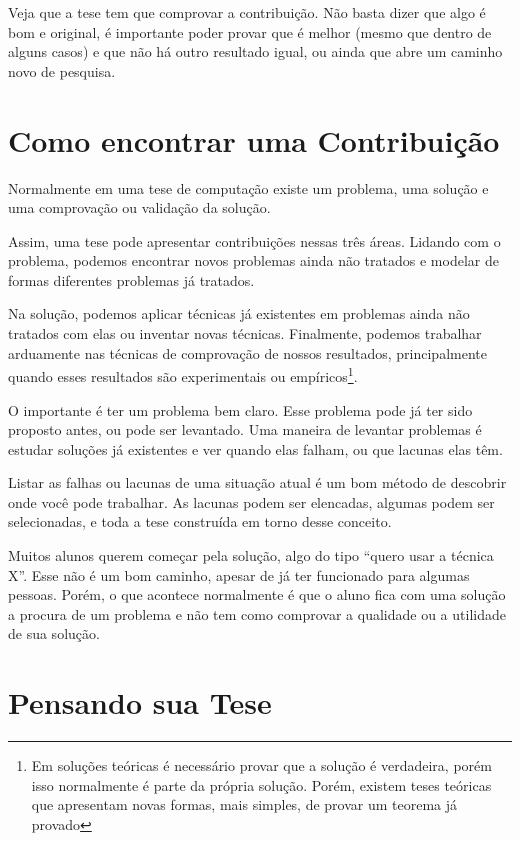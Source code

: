 Veja que a tese tem que comprovar a contribuição. Não basta dizer que algo é bom e original, é importante poder provar que é melhor (mesmo que dentro de alguns casos) e que não há outro resultado igual, ou ainda que abre um caminho novo de pesquisa.

\section{Como encontrar uma Contribuição}

Normalmente em uma tese de computação existe um problema, uma solução e uma comprovação ou validação da solução.

Assim, uma tese pode apresentar contribuições nessas três áreas. Lidando com o problema, podemos encontrar novos problemas ainda não tratados e modelar de formas diferentes problemas já tratados.

Na solução, podemos aplicar técnicas já existentes em problemas ainda não tratados com elas ou inventar novas técnicas. Finalmente, podemos trabalhar arduamente nas técnicas de comprovação de nossos resultados, principalmente quando esses resultados são experimentais ou empíricos\footnote{Em soluções teóricas é necessário provar que a solução é verdadeira, porém isso normalmente é parte da própria solução. Porém, existem teses teóricas que apresentam novas formas, mais simples, de provar um teorema já provado}.

O importante é ter um problema bem claro. Esse problema pode já ter sido proposto antes, ou pode ser levantado. Uma maneira de levantar problemas é estudar soluções já existentes e ver quando elas falham, ou que lacunas elas têm.

Listar as falhas ou lacunas de uma situação atual é um bom método de descobrir onde você pode trabalhar. As lacunas podem ser elencadas, algumas podem ser selecionadas, e toda a tese construída em torno desse conceito.

Muitos alunos querem começar pela solução, algo do tipo “quero usar a técnica X”. Esse não é um bom caminho, apesar de já ter funcionado para algumas pessoas. Porém, o que acontece normalmente é que o aluno fica com uma solução a procura de um problema e não tem como comprovar a qualidade ou a utilidade de sua solução.


\section{Pensando sua Tese}

